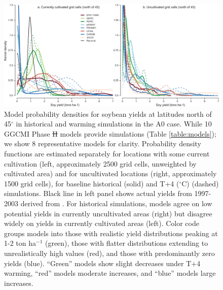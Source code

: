 \documentclass[gmd, manuscript]{copernicus} %
\providecommand{\DIFadd}[1]{{\protect\color{blue}\uwave{#1}}} %
\providecommand{\DIFdel}[1]{{\protect\color{red}\sout{#1}}}                      %
\providecommand{\DIFaddFL}[1]{\DIFadd{#1}} %
\providecommand{\DIFdelFL}[1]{\DIFdel{#1}} %
\providecommand{\DIFaddbeginFL}{} %
\providecommand{\DIFaddendFL}{} %
\providecommand{\DIFdelbeginFL}{} %
\providecommand{\DIFdelendFL}{} %
\begin{document}
\begin{figure}[ht]
\centering
  \includegraphics[width=15cm]{figures/soy_highlats.png}
  \caption{
  Model probability densities for soybean yields at latitudes north of 45$^\circ$ in historical and warming simulations in the A0 case. 
  While 10 GGCMI Phase \DIFdelbeginFL \DIFdelFL{II }\DIFdelendFL \DIFaddbeginFL \DIFaddFL{2 }\DIFaddendFL models provide simulations (Table \ref{table:models}); we show 8 representative models for clarity.
  Probability density functions are estimated separately for locations with some current cultivation (left, approximately 2500 grid cells, unweighted by cultivated area) and for uncultivated locations (right, approximately 1500 grid cells), for baseline historical (solid) and T+4 ($^{\circ}$C) (dashed) simulations. 
  Black line in left panel shows actual yields from 1997-2003 derived from \cite{Ray2012}. 
  For historical simulations, models agree on low potential yields in currently uncultivated areas (right) but disagree widely on yields in currently cultivated areas (left). 
  Color code groups models into those with realistic yield distributions peaking at 1-2 ton ha$^{-1}$ (green), those with flatter distributions extending to unrealistically high values (red), and those with predominantly zero yields (blue). 
  ``Green'' models show slight decreases under T+4 warming, ``red'' models moderate increases, and ``blue'' models large increases. 
  }
\label{fig:highlat}
\end{figure}
\end{document}

